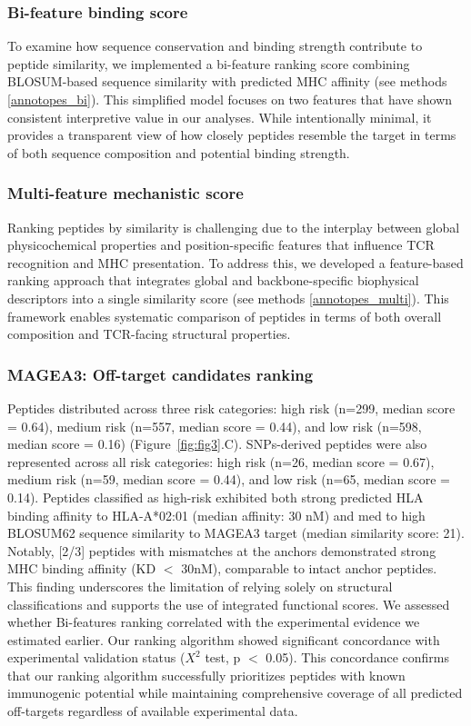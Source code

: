 \documentclass[unnumsec,webpdf,contemporary,large]{oup-authoring-template}%
\theoremstyle{thmstyleone}%
\theoremstyle{thmstyletwo}%
\theoremstyle{thmstylethree}%
\begin{document}
        \subsubsection{\textbf{Bi-feature binding score}} 
        To examine how sequence conservation and binding strength contribute to peptide similarity, we implemented a bi-feature ranking score combining BLOSUM-based sequence similarity with predicted MHC affinity (see methods \ref{annotopes_bi}). This simplified model focuses on two features that have shown consistent interpretive value in our analyses. While intentionally minimal, it provides a transparent view of how closely peptides resemble the target in terms of both sequence composition and potential binding strength.
        
        \subsubsection{\textbf{Multi-feature mechanistic score}} 
        Ranking peptides by similarity is challenging due to the interplay between global physicochemical properties and position-specific features that influence TCR recognition and MHC presentation. To address this, we developed a feature-based ranking approach that integrates global and backbone-specific biophysical descriptors into a single similarity score (see methods \ref{annotopes_multi}). This framework enables systematic comparison of peptides in terms of both overall composition and TCR-facing structural properties. 

        \subsubsection{\textbf{MAGEA3: Off-target candidates ranking}}
        Peptides distributed across three risk categories: high risk (n=299, median score = 0.64), medium risk (n=557, median score = 0.44), and low risk (n=598, median score = 0.16) (Figure~\ref{fig:fig3}.C). SNPs-derived peptides were also represented across all risk categories: high risk (n=26, median score = 0.67), medium risk (n=59, median score = 0.44), and low risk (n=65, median score = 0.14). 
        Peptides classified as high-risk exhibited both strong predicted HLA binding affinity to HLA-A*02:01 (median affinity: 30 nM) and med to high BLOSUM62 sequence similarity to MAGEA3 target (median similarity score: 21). Notably, [2/3] peptides with mismatches at the anchors demonstrated strong MHC binding affinity (KD $<$ 30nM), comparable to intact anchor peptides. This finding underscores the limitation of relying solely on structural classifications and supports the use of integrated functional scores. 
        We assessed whether Bi-features ranking correlated with the experimental evidence we estimated earlier. Our ranking algorithm showed significant concordance with experimental validation status ($X^2$ test, p $<$ 0.05). This concordance confirms that our ranking algorithm successfully prioritizes peptides with known immunogenic potential while maintaining comprehensive coverage of all predicted off-targets regardless of available experimental data.
        
\end{document}
